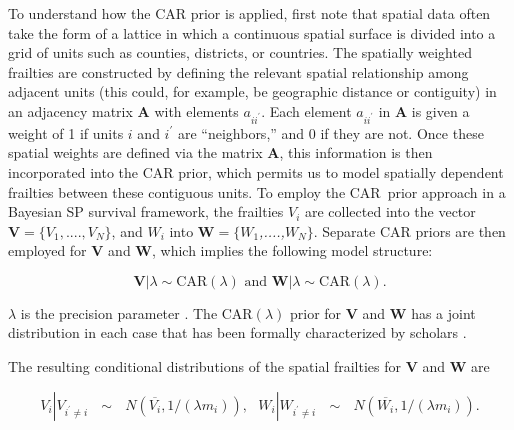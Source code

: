 To understand how the CAR prior is applied, first note that spatial data often
take the form of a lattice in which a continuous spatial surface is divided
into a grid of units such as counties, districts, or countries. The spatially
weighted frailties are constructed by defining the relevant spatial
relationship among adjacent units (this could, for example, be geographic distance or
contiguity) in an adjacency matrix $\mathbf{A}$
with elements $a_{ii^{\prime}}$. Each element $a_{ii^{\prime}}$ in
$\mathbf{A}$ is given a weight of 1 if units $i$ and $i^{\prime}$ are
``neighbors,'' and 0 if they are not. Once these spatial weights are defined via the matrix $\mathbf{A}$, this
information is then incorporated into the CAR prior, which permits us to model
spatially dependent frailties between these contiguous units. To employ the
CAR\ prior approach in a Bayesian SP survival framework, the
frailties $V_{i}$ are collected into the vector $\mathbf{V=\{}V_{1}%
,....,V_{N}\}$, and $W_{i}$ into $\mathbf{W=\{}W_{1}$\textit{,....,}$W_{N}\}$.
Separate CAR priors are then employed for $\mathbf{V}$ and $\mathbf{W}$, which
implies the following model structure:%

\begin{equation}
\mathbf{V|}\lambda\sim\text{CAR}\left(\lambda\right)\text{ and }\mathbf{W|}\lambda
\sim\text{CAR}\left(\lambda\right).
\end{equation}


\noindent $\lambda$ is the precision parameter
\citep{besag1991bayesian,banerjee2004parametric}. The
CAR$(\lambda)$ prior for $\mathbf{V}$ and $\mathbf{W}$ has a
joint distribution in each case that has been formally characterized by scholars \cite[126]{banerjee2003frailty}.


The resulting conditional distributions of the spatial frailties for $\mathbf{V}$ and
$\mathbf{W}$ are

\begin{equation}
V_{i}|V_{i^{\prime}\neq i}\text{ }\sim\text{ }N\left(\overline{V_{i}},1/\left(\lambda
m_{i}\right)\right),\text{ \ \ }W_{i}|W_{i^{\prime}\neq i}\text{ }\sim\text{ }
N\left(\overline{W_{i}},1/\left(\lambda m_{i}\right)\right).
\end{equation}


